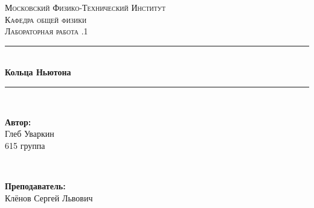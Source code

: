 \documentclass[a4paper, 12pt, twoside]{article}
\begin{document}
	\begin{titlepage}
		
		\newcommand{\HRule}{\rule{\linewidth}{0.7mm}} %
		
		\center %
		
		
		\textsc{\LARGE Московский Физико-Технический Институт}\\[1,5cm] %
		\textsc{\Large Кафедра общей физики}\\[0.5cm] %
		\textsc{\large Лабораторная работа .1}\\[0.5cm] %
		
		
		\HRule
		\\[0.4cm]
		{ \huge \bfseries Кольца Ньютона}
		\\[0.2cm] %
		\HRule
		\\[1.5cm]
		
		
		
		
		\begin{minipage}{0.4\textwidth}
			\begin{flushleft} \large
				\textbf{Автор:}\\
				Глеб Уваркин \\
				615 группа
			\end{flushleft}
		\end{minipage}
		~
		\begin{minipage}{0.4\textwidth}
			\begin{flushright} \large
				\textbf {Преподаватель:} \\
				Клёнов Сергей Львович %
			\end{flushright}
		\end{minipage}
		

\end{titlepage}
\end{document}
